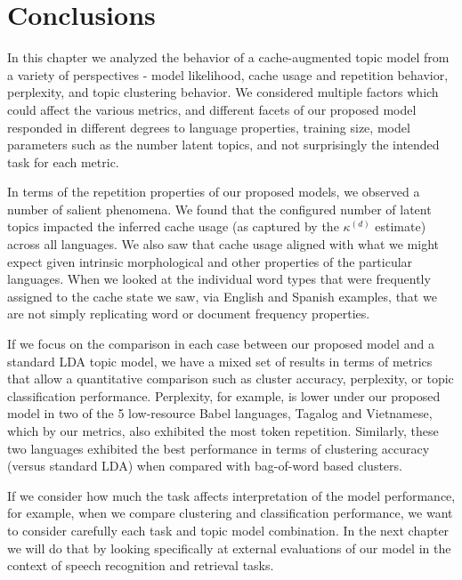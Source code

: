 
\section{Conclusions}

In this chapter we analyzed the behavior of a cache-augmented topic model from a variety of perspectives - model likelihood, cache usage and repetition behavior, perplexity, and topic clustering behavior.   We considered multiple factors which could affect the various metrics, and different facets of our proposed model responded in different degrees to language properties, training size, model parameters such as the number latent topics, and not surprisingly the intended task for each metric.   

In terms of the repetition properties of our proposed models, we observed a number of salient phenomena.  We found that the configured number of latent topics impacted the inferred cache usage (as captured by the $\kappa^{(d)}$ estimate) across all languages.  We also saw that cache usage aligned with what we might expect given intrinsic morphological and other properties of the particular languages.  When we looked at the individual word types that were frequently assigned to the cache state we saw, via English and Spanish examples, that we are not simply replicating word or document frequency properties.

If we focus on the comparison in each case between our proposed model and a standard LDA topic model, we have a mixed set of results in terms of metrics that allow a quantitative comparison such as cluster accuracy, perplexity, or topic classification performance.   Perplexity, for example, is lower under our proposed model in two of the 5 low-resource Babel languages, Tagalog and Vietnamese, which by our metrics, also exhibited the most token repetition.  Similarly, these two languages exhibited the best performance in terms of clustering accuracy (versus standard LDA) when compared with bag-of-word based clusters.

If we consider how much the task affects interpretation of the model performance, for example, when we compare clustering and classification performance, we want to consider carefully each task and topic model combination.  In the next chapter we will do that  by looking specifically at external evaluations of our model in the context of speech recognition and retrieval tasks.  




